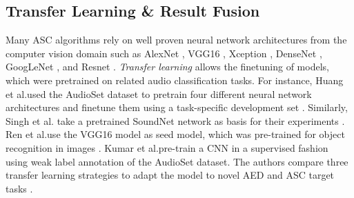 \documentclass[applsci,article,submit,oneauthor,pdftex]{Definitions/mdpi}
\makeatletter
\newcommand{\etal}{{et al}.\@ }
\makeatother
\begin{document}
\subsection{Transfer Learning \& Result Fusion}
\label{sec:transfer_learning}

Many ASC algorithms rely on well proven neural network architectures from the computer vision domain such as AlexNet \citep{Boddapati:2017:ASC:PCS, Ren:2018:AttentionASC:DCASE}, VGG16 \citep{Ren:2017:DeepSequentialASC:DCASE}, Xception \citep{Yang:2018:MultiScaleFeatures:DCASE}, DenseNet \citep{Koutini:2019:ReceptiveField:DCASE}, GoogLeNet \citep{Boddapati:2017:ASC:PCS}, 
and Resnet \citep{Mariotti:2018:DeepVisionASC:DCASE, Lehner:2019:ASCReject:DCASE}.
\textit{Transfer learning} allows the finetuning of models, which were pretrained on related audio classification tasks.
For instance, Huang \etal used the AudioSet dataset to pretrain four different neural network architectures and finetune them using a task-specific development set \citep{Huang:2019:ASCEnsemble:DCASE}. Similarly, Singh et al. take a pretrained SoundNet \citep{Aytar:2016:SoundNet:NIPS} network as basis for their experiments \citep{Singh:2018:EnsembleASC:EUSIPCO, Singh:2019:MultiViewFeatures:DCASE}.
Ren \etal use the VGG16 model as seed model, which was pre-trained for object recognition in images \citep{Ren:2017:DeepSequentialASC:DCASE}. 
Kumar \etal pre-train a CNN in a supervised fashion using weak label annotation of the AudioSet dataset. The authors compare three transfer learning strategies to adapt the model to novel AED and ASC target tasks \citep{Kumar:2018:ASC:ICASSP}.
\end{document}
